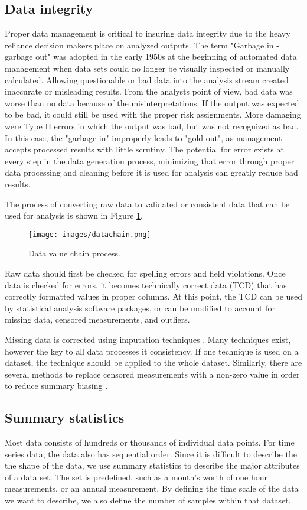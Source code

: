 \subsection{Data integrity}
Proper data management is critical to insuring data integrity due to the heavy reliance decision makers place on analyzed outputs. The term "Garbage in - garbage out" was adopted in the early 1950s at the beginning of automated data management when data sets could no longer be visually inspected or manually calculated. Allowing questionable or bad data into the analysis stream created inaccurate or misleading results. From the analysts point of view, bad data was worse than no data because of the misinterpretations. If the output was expected to be bad, it could still be used with the proper risk assignments. More damaging were Type II errors in which the output was bad, but was not recognized as bad. In this case, the "garbage in" improperly leads to "gold out", as management accepts processed results with little scrutiny. The potential for error exists at every step in the data generation process, minimizing that error through proper data processing and cleaning before it is used for analysis can greatly reduce bad results.

The process of converting raw data to validated or consistent data that can be used for analysis is shown in Figure \ref{fig:datachain}.
%
\begin{figure}[!htpb]
\centering
\texttt{[image: images/datachain.png]} 
\caption{Data value chain process.}
\label{fig:datachain}
\end{figure}
%
Raw data should first be checked for spelling errors and field violations. Once data is checked for errors, it becomes technically correct data (TCD) that has correctly formatted values in proper columns. At this point, the TCD can be used by statistical analysis software packages, or can be modified to account for missing data, censored measurements, and outliers.

Missing data is corrected using imputation techniques \citep{Horton2007, Ellington2015}. Many techniques exist, however the key to all data processes it consistency. If one technique is used on a dataset, the technique should be applied to the whole dataset. Similarly, there are several methods to replace censored measurements with a non-zero value in order to reduce summary biasing \citep{Helsel2011}.

\subsection{Summary statistics}
Most data consists of hundreds or thousands of individual data points. For time series data, the data also has sequential order. Since it is difficult to describe the the shape of the data, we use summary statistics to describe the major attributes of a data set. The set is predefined, such as a month's worth of one hour measurements, or an annual measurement. By defining the time scale of the data we want to describe, we also define the number of samples within that dataset.

